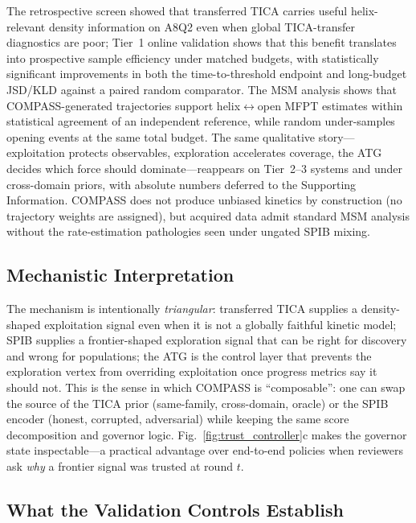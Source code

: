 \documentclass[journal=jctcce,manuscript=article,layout=twocolumn]{achemso}
\begin{document}
The retrospective screen showed that transferred TICA carries useful helix-relevant density information on A8Q2 even when global TICA-transfer diagnostics are poor; Tier~1 online validation shows that this benefit translates into prospective sample efficiency under matched budgets, with statistically significant improvements in both the time-to-threshold endpoint and long-budget JSD/KLD against a paired random comparator. The MSM analysis shows that COMPASS-generated trajectories support helix$\leftrightarrow$open MFPT estimates within statistical agreement of an independent reference, while random under-samples opening events at the same total budget. The same qualitative story---exploitation protects observables, exploration accelerates coverage, the ATG decides which force should dominate---reappears on Tier~2--3 systems and under cross-domain priors, with absolute numbers deferred to the Supporting Information. COMPASS does not produce unbiased kinetics by construction (no trajectory weights are assigned), but acquired data admit standard MSM analysis without the rate-estimation pathologies seen under ungated SPIB mixing.

\subsection{Mechanistic Interpretation}

The mechanism is intentionally \emph{triangular}: transferred TICA supplies a density-shaped exploitation signal even when it is not a globally faithful kinetic model; SPIB supplies a frontier-shaped exploration signal that can be right for discovery and wrong for populations; the ATG is the control layer that prevents the exploration vertex from overriding exploitation once progress metrics say it should not. This is the sense in which COMPASS is ``composable'': one can swap the source of the TICA prior (same-family, cross-domain, oracle) or the SPIB encoder (honest, corrupted, adversarial) while keeping the same score decomposition and governor logic. Fig.~\ref{fig:trust_controller}c makes the governor state inspectable---a practical advantage over end-to-end policies when reviewers ask \emph{why} a frontier signal was trusted at round $t$.

\subsection{What the Validation Controls Establish}
\label{sec:discussion_battery}
\end{document}
